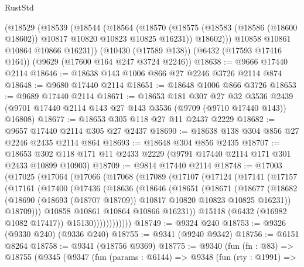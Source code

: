 \begin{lexlean}{RustStd}
\begin{coremodule}
    (@18529
      (@18539
        (@18544
          (@18564
            (@18570
              (@18575 (@18583 (@18586 (@18600 @18602)) @10817 @10820 @10823 @10825 @16231))
              @18602)))
        @10858
        @10861
        @10864
        @10866
        @16231))
    (@10430 (@17589 @138))
    (@6432 (@17593 @17416 @164))
    (@9629 (@17600 @164 @247 @3724 @2246))
@18638 := @9666 @17440 @2114
@18646 := @18638 @143 @1006 @866 @27 @2246 @3726 @2114 @874
@18648 := @9680 @17440 @2114
@18651 := @18648 @1006 @866 @3726
@18653 := @9689 @17440 @2114
@18671 := @18653
    @181
    @307
    @27
    @32
    @3536
    @2439
    (@9701 @17440 @2114 @143 @27 @143 @3536 (@9709 (@9710 @17440 @143)) @16808)
@18677 := @18653 @305 @118 @27 @11 @2437 @2229
@18682 := @9657 @17440 @2114 @305 @27 @2437
@18690 := @18638 @138 @304 @856 @27 @2246 @2435 @2114 @864
@18693 := @18648 @304 @856 @2435
@18707 := @18653 @302 @118 @171 @11 @2433 @2229 (@9791 @17440 @2114 @171 @301 @2433 @10899 @10903)
@18709 := @9814 @17440 @2114
@18748 := @17003
    (@17025
      (@17064
        (@17066
          (@17068
            (@17089
              (@17107
                (@17124
                  (@17141
                    (@17157
                      (@17161
                        (@17400
                          (@17436
                            (@18636
                              (@18646
                                (@18651
                                  (@18671
                                    (@18677
                                      (@18682
                                        (@18690
                                          (@18693 (@18707 @18709))
                                          @10817
                                          @10820
                                          @10823
                                          @10825
                                          @16231))
                                      @18709)))
                                @10858
                                @10861
                                @10864
                                @10866
                                @16231))
                            @15118
                            (@6432 (@16982 @1082 @17417))
                            @15130))))))))))))
@18749 := @9324 @240
@18753 := @9326 (@9330 @240) (@9336 @240)
@18755 := @9341 (@9240 @9342)
@18756 := @6151 @8264
@18758 := @9341 (@18756 @9369)
@18775 := @9340
    (fun (fn : @83) =>
    @18755
      (@9345
        (@9347
          (fun (params : @6144) =>
          @9348
            (fun (rty : @1991) =>

\end{coremodule}
\end{lexlean}
